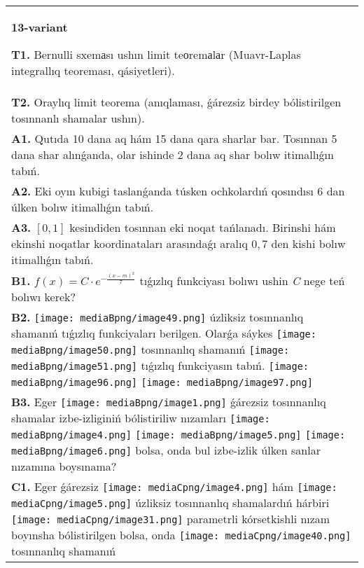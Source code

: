 \documentclass{article}
\begin{document}
\begin{tabular}{m{17cm}}
\textbf{13-variant}
\newline

\textbf{T1.} Bernulli sxemаsı ushın limit teоremаlаr (Muavr-Laplas integrallıq teoreması, qásiyetleri).
 \\
\textbf{T2.} Oraylıq limit teorema (anıqlaması, ǵárezsiz birdey bólistirilgen tosınnanlı shamalar ushın).
 \\
\textbf{A1.} Qutıda 10 dana aq hám 15 dana qara sharlar bar. Tosınnan 5 dana shar alınǵanda, olar ishinde 2 dana aq shar bolıw itimallıǵın tabıń.
 \\
\textbf{A2.} Eki oyın kubigi taslanǵanda túsken ochkolardıń qosındısı 6 dan úlken bolıw itimallıǵın tabıń.
 \\
\textbf{A3.} $\left[ 0,1 \right]$ kesindiden tosınnan eki noqat tańlanadı. Birinshi hám ekinshi noqatlar koordinataları arasındaǵı aralıq $0,7$ den kishi bolıw itimallıǵın tabıń.
 \\
\textbf{B1.} \(f(x) = C \cdot e^{- \frac{(x - m)^{2}}{7}}\) tıǵızlıq funkciyası bolıwı ushin \emph{C} nege teń bolıwı kerek?
 \\
\textbf{B2.} \texttt{[image: mediaBpng/image49.png]} úzliksiz tosınnanlıq shamanıń tıǵızlıq funkciyaları berilgen. Olarǵa sáykes \texttt{[image: mediaBpng/image50.png]} tosınnanlıq shamanıń \texttt{[image: mediaBpng/image51.png]} tıǵızlıq funkciyasın tabıń. \texttt{[image: mediaBpng/image96.png]} \texttt{[image: mediaBpng/image97.png]}
 \\
\textbf{B3.} Eger \texttt{[image: mediaBpng/image1.png]} ǵárezsiz tosınnanlıq shamalar izbe-izliginiń bólistiriliw nızamları
\texttt{[image: mediaBpng/image4.png]} \texttt{[image: mediaBpng/image5.png]} \texttt{[image: mediaBpng/image6.png]}
bolsa, onda bul izbe-izlik úlken sanlar nızamına boysınama?
 \\
\textbf{C1.} Eger ǵárezsiz \texttt{[image: mediaCpng/image4.png]} hám \texttt{[image: mediaCpng/image5.png]} úzliksiz tosınnanlıq shamalardıń hárbiri \texttt{[image: mediaCpng/image31.png]} parametrli
kórsetkishli nızam boyınsha bólistirilgen bolsa, onda \texttt{[image: mediaCpng/image40.png]} tosınnanlıq shamanıń

\end{tabular}
\end{document}
